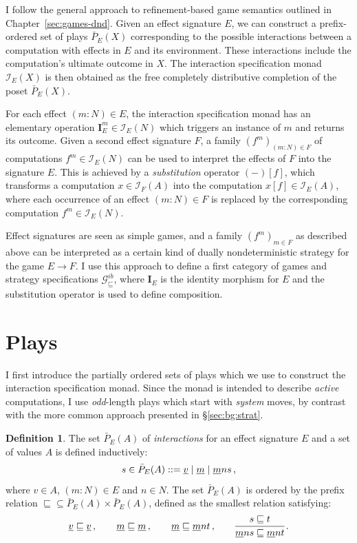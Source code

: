 \documentclass[11pt,oneside]{book}
\theoremstyle{definition}
\newtheorem{definition}[theorem]{Definition}
\newcommand{\gcat}{\mathcal{G}_{\sqsubseteq}}
\newcommand{\ul}[1]{%
  \underline{\smash{#1}}
}
\begin{document}
I follow the general approach
to refinement-based game semantics
outlined in Chapter~\ref{sec:games-dnd}.
Given an effect signature $E$,
we can construct a prefix-ordered set of plays $\bar{P}_E(X)$
corresponding to the possible interactions between
a computation with effects in $E$
and its environment.
These interactions include the computation's ultimate outcome in $X$.
The interaction specification monad $\mathcal{I}_E(X)$ is then obtained
as the free completely distributive completion of the poset $\bar{P}_E(X)$.

For each effect $(m \mathbin: N) \in E$,
the interaction specification monad
has an elementary operation
$\mathbf{I}_E^m \in \mathcal{I}_E(N)$
which triggers an instance of $m$ and returns its outcome.
Given a second effect signature $F$,
a family $(f^m)_{(m \mathbin: N) \in F}$ of computations
$f^m \in \mathcal{I}_E(N)$
can be used to interpret the effects of $F$
into the signature $E$.
This is achieved by a \emph{substitution} operator $(-)[f]$,
which transforms a computation $x \in \mathcal{I}_F(A)$
into the computation $x[f] \in \mathcal{I}_E(A)$,
where each occurrence of an effect $(m \mathbin: N) \in F$
is replaced by the corresponding computation $f^m \in \mathcal{I}_E(N)$.

Effect signatures are seen as
simple games,
and a family $(f^m)_{m \in F}$ as described above
can be interpreted as
a certain kind of
dually nondeterministic strategy for the game $E \rightarrow F$.
I use this approach to define
a first category of games and strategy specifications $\gcat^{ib}$,
where $\mathbf{I}_E$ is %
the identity morphism for $E$ and
the substitution operator
is used to define composition.


\section{Plays} \label{sec:intm:plays} %

I first introduce the partially ordered sets of plays
which we use to construct the interaction specification monad.
Since the monad is intended to describe \emph{active} computations,
I use \emph{odd}-length plays which start with \emph{system} moves,
by contrast with the more common approach
presented in \S\ref{sec:bg:strat}.

\begin{definition}
The set $\bar{P}_E(A)$ of \emph{interactions}
for an effect signature $E$ and a set of values $A$
is defined inductively:
\[
  s \in \bar{P}_E(A) ::=
    \ul{v} \mid
    \ul{m} \mid
    \ul{m} n s \,,
\]
where $v \in A$, $(m \mathbin: N) \in E$ and $n \in N$.
The set $\bar{P}_E(A)$ is ordered by the prefix relation
${\sqsubseteq} \subseteq \bar{P}_E(A) \times \bar{P}_E(A)$,
defined
as the smallest relation satisfying:
\[
  \ul{v} \sqsubseteq \ul{v} \,, \qquad
  \ul{m} \sqsubseteq \ul{m} \,, \qquad
  \ul{m} \sqsubseteq \ul{m} n t \,, \qquad
  \begin{prooftree}
    \hypo{s \sqsubseteq t}
    \infer1{\ul{m} n s \sqsubseteq \ul{m} n t}
  \end{prooftree} \,.
\]
\end{definition}
\end{document}
